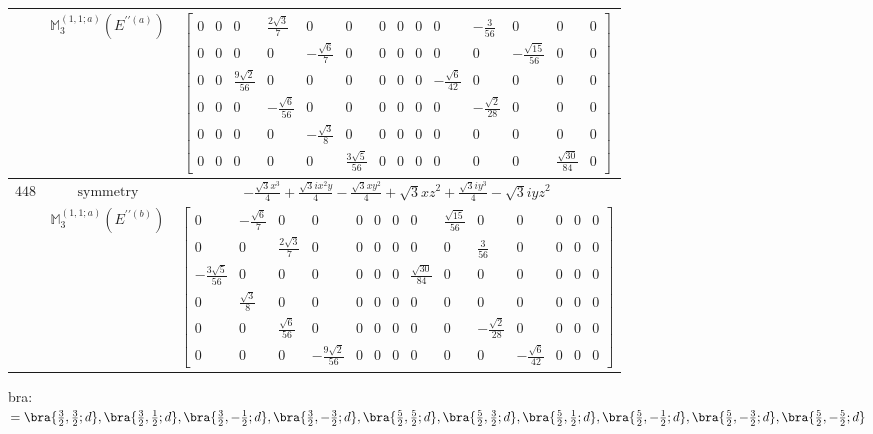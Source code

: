 \documentclass[fleqn,8pt,landscape]{jsarticle}
\begin{document}
\begin{longtable}{ccc}
$  $ & $ \mathbb{M}_{3}^{(1,1;a)}(E^{\prime\prime(a)}) $ & $ \begin{bmatrix} 0 & 0 & 0 & \frac{2 \sqrt{3}}{7} & 0 & 0 & 0 & 0 & 0 & 0 & - \frac{3}{56} & 0 & 0 & 0 \\ 0 & 0 & 0 & 0 & - \frac{\sqrt{6}}{7} & 0 & 0 & 0 & 0 & 0 & 0 & - \frac{\sqrt{15}}{56} & 0 & 0 \\ 0 & 0 & \frac{9 \sqrt{2}}{56} & 0 & 0 & 0 & 0 & 0 & 0 & - \frac{\sqrt{6}}{42} & 0 & 0 & 0 & 0 \\ 0 & 0 & 0 & - \frac{\sqrt{6}}{56} & 0 & 0 & 0 & 0 & 0 & 0 & - \frac{\sqrt{2}}{28} & 0 & 0 & 0 \\ 0 & 0 & 0 & 0 & - \frac{\sqrt{3}}{8} & 0 & 0 & 0 & 0 & 0 & 0 & 0 & 0 & 0 \\ 0 & 0 & 0 & 0 & 0 & \frac{3 \sqrt{5}}{56} & 0 & 0 & 0 & 0 & 0 & 0 & \frac{\sqrt{30}}{84} & 0 \end{bmatrix} $ \\ \hline
$ 448 $ & $ \text{symmetry} $ & $ - \frac{\sqrt{3} x^{3}}{4} + \frac{\sqrt{3} i x^{2} y}{4} - \frac{\sqrt{3} x y^{2}}{4} + \sqrt{3} x z^{2} + \frac{\sqrt{3} i y^{3}}{4} - \sqrt{3} i y z^{2} $ \\
$  $ & $ \mathbb{M}_{3}^{(1,1;a)}(E^{\prime\prime(b)}) $ & $ \begin{bmatrix} 0 & - \frac{\sqrt{6}}{7} & 0 & 0 & 0 & 0 & 0 & 0 & \frac{\sqrt{15}}{56} & 0 & 0 & 0 & 0 & 0 \\ 0 & 0 & \frac{2 \sqrt{3}}{7} & 0 & 0 & 0 & 0 & 0 & 0 & \frac{3}{56} & 0 & 0 & 0 & 0 \\ - \frac{3 \sqrt{5}}{56} & 0 & 0 & 0 & 0 & 0 & 0 & \frac{\sqrt{30}}{84} & 0 & 0 & 0 & 0 & 0 & 0 \\ 0 & \frac{\sqrt{3}}{8} & 0 & 0 & 0 & 0 & 0 & 0 & 0 & 0 & 0 & 0 & 0 & 0 \\ 0 & 0 & \frac{\sqrt{6}}{56} & 0 & 0 & 0 & 0 & 0 & 0 & - \frac{\sqrt{2}}{28} & 0 & 0 & 0 & 0 \\ 0 & 0 & 0 & - \frac{9 \sqrt{2}}{56} & 0 & 0 & 0 & 0 & 0 & 0 & - \frac{\sqrt{6}}{42} & 0 & 0 & 0 \end{bmatrix} $ \\ \hline
\end{longtable}
bra: $=\bra{\frac{3}{2},\frac{3}{2};d}, \bra{\frac{3}{2},\frac{1}{2};d}, \bra{\frac{3}{2},- \frac{1}{2};d}, \bra{\frac{3}{2},- \frac{3}{2};d}, \bra{\frac{5}{2},\frac{5}{2};d}, \bra{\frac{5}{2},\frac{3}{2};d}, \bra{\frac{5}{2},\frac{1}{2};d}, \bra{\frac{5}{2},- \frac{1}{2};d}, \bra{\frac{5}{2},- \frac{3}{2};d}, \bra{\frac{5}{2},- \frac{5}{2};d}$
\end{document}

